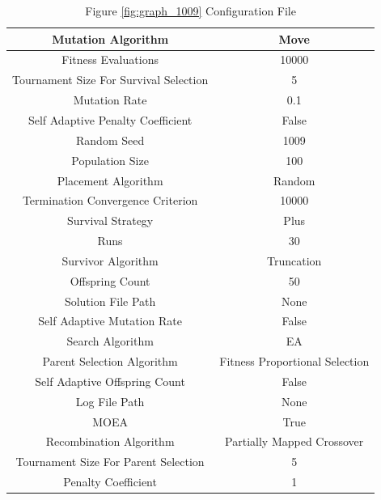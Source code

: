 \documentclass{standalone}
\begin{document}
\begin{table}[!htb]
	\centering
	\caption{Figure \ref{fig:graph_1009} Configuration File}
	\label{tab:graph_1009}
	\begin{tabular}{| c | c |}
		\hline
		Mutation Algorithm		& Move		 \\
		\hline
		Fitness Evaluations		& 10000		 \\
		\hline
		Tournament Size For Survival Selection		& 5		 \\
		\hline
		Mutation Rate		& 0.1		 \\
		\hline
		Self Adaptive Penalty Coefficient		& False		 \\
		\hline
		Random Seed		& 1009		 \\
		\hline
		Population Size		& 100		 \\
		\hline
		Placement Algorithm		& Random		 \\
		\hline
		Termination Convergence Criterion		& 10000		 \\
		\hline
		Survival Strategy		& Plus		 \\
		\hline
		Runs		& 30		 \\
		\hline
		Survivor Algorithm		& Truncation		 \\
		\hline
		Offspring Count		& 50		 \\
		\hline
		Solution File Path		& None		 \\
		\hline
		Self Adaptive Mutation Rate		& False		 \\
		\hline
		Search Algorithm		& EA		 \\
		\hline
		Parent Selection Algorithm		& Fitness Proportional Selection		 \\
		\hline
		Self Adaptive Offspring Count		& False		 \\
		\hline
		Log File Path		& None		 \\
		\hline
		MOEA		& True		 \\
		\hline
		Recombination Algorithm		& Partially Mapped Crossover		 \\
		\hline
		Tournament Size For Parent Selection		& 5		 \\
		\hline
		Penalty Coefficient		& 1		 \\
		\hline
	\end{tabular}
\end{table}
\end{document}
